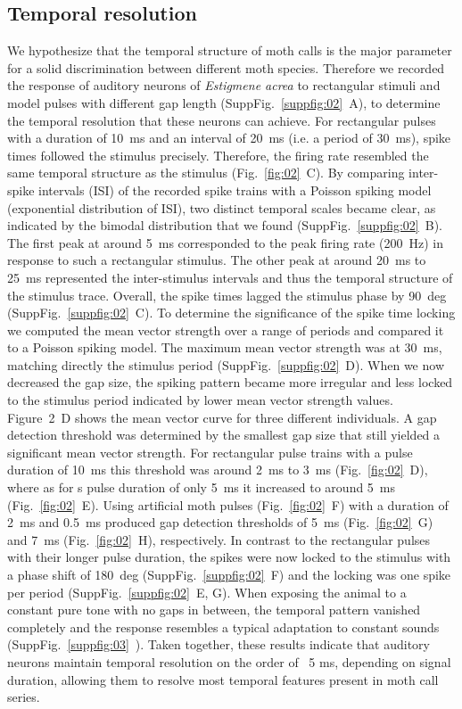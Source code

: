 \documentclass[12pt,a4paper]{article}
\newcommand{\species}[1]{\textit{#1}}
\newcommand{\fig}[2]{(Fig.~#1~#2)}
\newcommand{\suppfig}[2]{(SuppFig.~#1~#2)}
\begin{document}
\subsection{Temporal resolution}
We hypothesize that the temporal structure of moth calls is the major parameter for a solid discrimination between different moth species. Therefore we recorded the response of auditory neurons of \species{Estigmene acrea} to rectangular stimuli and model pulses with different gap length \suppfig{\ref{suppfig:02}}{A}, to determine the temporal resolution that these neurons can achieve. For rectangular pulses with a duration of 10~ms and an interval of 20~ms (i.e. a period of 30~ms), spike times followed the stimulus precisely. Therefore, the firing rate resembled the same temporal structure as the stimulus \fig{\ref{fig:02}}{C}. By comparing inter-spike intervals (ISI) of the recorded spike trains with a Poisson spiking model (exponential distribution of ISI), two distinct temporal scales became clear, as indicated by the bimodal distribution that we found  \suppfig{\ref{suppfig:02}}{B}. The first peak at around 5~ms corresponded to the peak firing rate (200~Hz) in response to such a rectangular stimulus. The other peak at around 20~ms to 25~ms represented the inter-stimulus intervals and thus the temporal structure of the stimulus trace. Overall, the spike times lagged the stimulus phase by 90~deg  \suppfig{\ref{suppfig:02}}{C}. To determine the significance of the spike time locking we computed the mean vector strength over a range of periods and compared it to a Poisson spiking model. The maximum mean vector strength was at 30~ms, matching directly the stimulus period \suppfig{\ref{suppfig:02}}{D}. When we now decreased the gap size, the spiking pattern became more irregular and less locked to the stimulus period indicated by lower mean vector strength values. Figure~2~D shows the mean vector curve for three different individuals. A gap detection threshold was determined by the smallest gap size that still yielded a significant mean vector strength. For rectangular pulse trains with a pulse duration of 10~ms this threshold was around 2~ms to 3~ms \fig{\ref{fig:02}}{D}, where as for s pulse duration of only 5~ms it increased to around 5~ms \fig{\ref{fig:02}}{E}. Using artificial moth pulses \fig{\ref{fig:02}}{F} with a duration of 2~ms and 0.5~ms produced gap detection thresholds of 5~ms \fig{\ref{fig:02}}{G} and 7~ms \fig{\ref{fig:02}}{H}, respectively. In contrast to the rectangular pulses with their longer pulse duration, the spikes were now locked to the stimulus with a phase shift of 180~deg \suppfig{\ref{suppfig:02}}{F} and the locking was one spike per period \suppfig{\ref{suppfig:02}}{E, G}. When exposing the animal to a constant pure tone with no gaps in between, the temporal pattern vanished completely and the response resembles a typical adaptation to constant sounds \suppfig{\ref{suppfig:03}}{}. Taken together, these results indicate that auditory neurons maintain temporal resolution on the order of ~5 ms, depending on signal duration, allowing them to resolve most temporal features present in moth call series.
\end{document}
